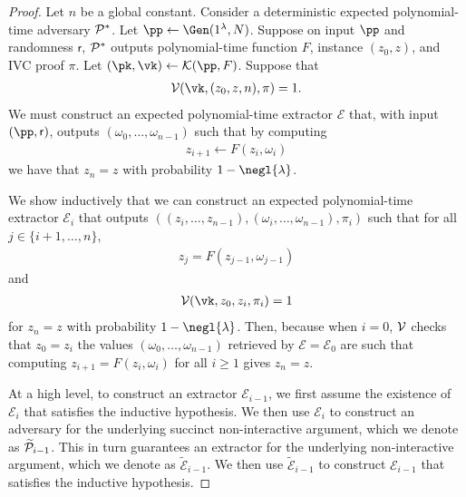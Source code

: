 \begin{proof}
   Let $n$ be a global constant.
   Consider a deterministic expected polynomial-time adversary $\mathcal{P}^*$.
   Let $\pp \gets \Gen(1^{\lambda}, N)$.
   Suppose 
   on input $\pp$ and randomness $\mathsf{r}$,
   $\mathcal{P}^*$
   outputs 
   polynomial-time function $F$,
   instance $(z_0, z)$,
   and IVC proof $\pi$. 
   Let $(\pk, \vk) \gets \En(\pp, F)$.
   Suppose that
   \begin{align*}
     \V(\vk, (z_0, z, n), \pi) = 1.
   \end{align*}
   We must construct an expected polynomial-time extractor $\mathcal{E}$
   that, 
   with input $(\pp, \mathsf{r})$,
   outputs $(\omega_0, \ldots, \omega_{n - 1})$ 
   such that by computing
   \begin{align*}
     z_{i + 1} \gets F(z_{i}, \omega_{i})
   \end{align*}
   we have that $z_n = z$ with probability 
   $1 - \negl{\lambda}$.
   
   We show inductively that we can construct an expected polynomial-time extractor $\mathcal{E}_i$ that outputs 
   $((z_i, \ldots, z_{n - 1}), (\omega_i, \ldots, \omega_{n - 1}), \pi_i)$ such that for all $j \in  \{i + 1, \ldots, n\}$,
   \begin{align*}
     z_j = F(z_{j - 1}, \omega_{j - 1})
   \end{align*}
   and 
   \begin{align}\label{eq:ih:2}
     \V(\vk, z_0, z_i, \pi_i) = 1
   \end{align}
   for $z_n = z$ with probability $1 - \negl{\lambda}$.
   Then, 
   because when $i = 0$,
   $\mathcal{V}$ checks that $z_0 = z_i$ 
   the values $(\omega_0, \ldots, \omega_{n - 1})$ 
   retrieved by $\mathcal{E} = \mathcal{E}_0$
   are such that computing  
   $z_{i + 1} = F(z_i, \omega_i)$ for all $i \geq 1$ gives $z_n = z$.
   
   At a high level,
   to construct an extractor $\mathcal{E}_{i - 1}$,
   we first assume the existence of $\mathcal{E}_i$ that satisfies the inductive hypothesis. 
   We then use $\mathcal{E}_i$ to construct an adversary 
   for the underlying succinct non-interactive argument, which we denote as $\widetilde{\mathcal{P}}_{i - 1}$.
   This in turn guarantees an extractor for the underlying non-interactive argument,
   which we denote as $\widetilde{\mathcal{E}}_{i - 1}$. 
   We then use $\widetilde{\mathcal{E}}_{i - 1}$ to construct $\mathcal{E}_{i - 1}$ that satisfies the inductive hypothesis.
   

\end{proof}
